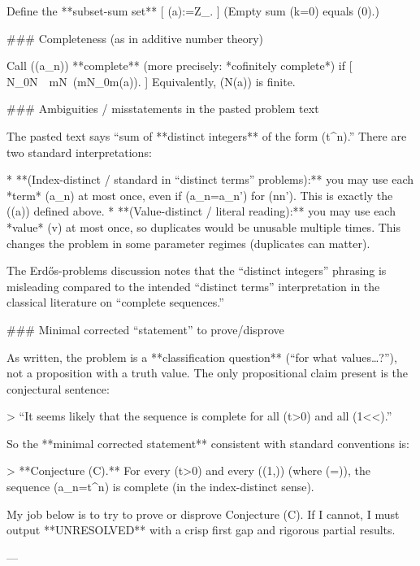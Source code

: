 Define the **subset-sum set**
[
\Sigma(a):=\subseteq\mathbb Z_{}.
]
(Empty sum (k=0) equals (0).)

### Completeness (as in additive number theory)

Call ((a_n)) **complete** (more precisely: *cofinitely complete*) if
[
\exists N_0\in\mathbb N\ \ \forall m\in\mathbb N\ (m\ge N_0\implies m\in \Sigma(a)).
]
Equivalently, (\mathbb N\setminus \Sigma(a)) is finite.

### Ambiguities / misstatements in the pasted problem text

The pasted text says “sum of **distinct integers** of the form (\lfloor t\alpha^n\rfloor).” There are two standard interpretations:

* **(Index-distinct / standard in “distinct terms” problems):** you may use each *term* (a_n) at most once, even if (a_n=a_{n'}) for (n\neq n'). This is exactly the (\Sigma(a)) defined above.
* **(Value-distinct / literal reading):** you may use each *value* (v) at most once, so duplicates would be unusable multiple times. This changes the problem in some parameter regimes (duplicates can matter).

The Erdős-problems discussion notes that the “distinct integers” phrasing is misleading compared to the intended “distinct terms” interpretation in the classical literature on “complete sequences.”

### Minimal corrected “statement” to prove/disprove

As written, the problem is a **classification question** (“for what values…?”), not a proposition with a truth value. The only propositional claim present is the conjectural sentence:

> “It seems likely that the sequence is complete for all (t>0) and all (1<\alpha<).”

So the **minimal corrected statement** consistent with standard conventions is:

> **Conjecture (C).** For every (t>0) and every (\alpha\in(1,\varphi)) (where (\varphi=)), the sequence (a_n=\lfloor t\alpha^n\rfloor) is complete (in the index-distinct sense).

My job below is to try to prove or disprove Conjecture (C). If I cannot, I must output **UNRESOLVED** with a crisp first gap and rigorous partial results.

---


